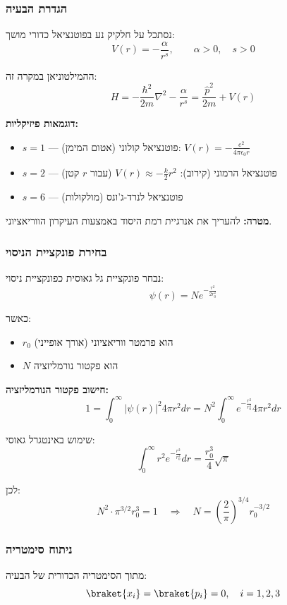 \subsubsection*{הגדרת הבעיה}

נסתכל על חלקיק נע בפוטנציאל כדורי מושך:
\[
V(r) = -\frac{\alpha}{r^s}, \qquad \alpha > 0, \quad s > 0
\]

ההמילטוניאן במקרה זה:
\[
H = -\frac{\hbar^2}{2m}\nabla^2 - \frac{\alpha}{r^s} = \frac{\hat{p}^2}{2m} + V(r)
\]

\textbf{דוגמאות פיזיקליות:}
\begin{itemize}
    \item $s = 1$ — פוטנציאל קולוני (אטום המימן): $V(r) = -\frac{e^2}{4\pi\epsilon_0 r}$
    \item $s = 2$ — פוטנציאל הרמוני (קירוב): $V(r) \approx -\frac{k}{2}r^2$ (עבור $r$ קטן)
    \item $s = 6$ — פוטנציאל לנרד-ג'ונס (מולקולות)
\end{itemize}

\textbf{מטרה:} להעריך את אנרגיית רמת היסוד באמצעות העיקרון הווריאציוני.

\subsubsection*{בחירת פונקציית הניסוי}

נבחר פונקציית גל גאוסית כפונקציית ניסוי:
\[
\psi(r) = N e^{-\frac{r^2}{2r_0^2}}
\]

כאשר:
\begin{itemize}
    \item $r_0$ הוא פרמטר ווריאציוני (אורך אופייני)
    \item $N$ הוא פקטור נורמליזציה
\end{itemize}

\textbf{חישוב פקטור הנורמליזציה:}
\[
1 = \int_0^{\infty} |\psi(r)|^2 4\pi r^2 dr = N^2 \int_0^{\infty} e^{-\frac{r^2}{r_0^2}} 4\pi r^2 dr
\]

שימוש באינטגרל גאוסי:
\[
\int_0^{\infty} r^2 e^{-\frac{r^2}{r_0^2}} dr = \frac{r_0^3}{4}\sqrt{\pi}
\]

לכן:
\[
N^2 \cdot \pi^{3/2} r_0^3 = 1 \quad \Rightarrow \quad \boxed{N = \left(\frac{2}{\pi}\right)^{3/4} r_0^{-3/2}}
\]

\subsubsection*{ניתוח סימטריה}

מתוך הסימטריה הכדורית של הבעיה:
\[
\braket{x_i} = \braket{p_i} = 0, \quad i = 1,2,3
\]

